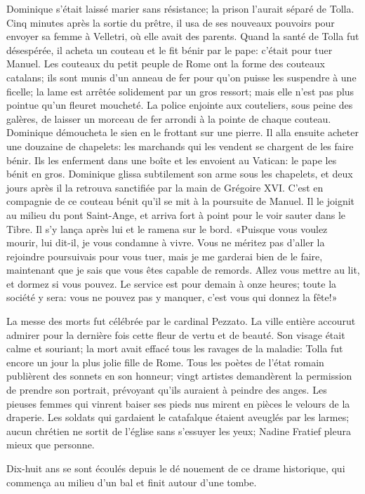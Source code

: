Dominique s'était laissé marier sans résistance; la prison l'aurait séparé de Tolla. Cinq minutes après la sortie du prêtre, il usa de ses nouveaux pouvoirs pour envoyer sa femme à Velletri, où elle avait des parents. Quand la santé de Tolla fut désespérée, il acheta un couteau et le fit bénir par le pape: c'était pour tuer Manuel. Les couteaux du petit peuple de Rome ont la forme des couteaux catalans; ils sont munis d'un anneau de fer pour qu'on puisse les suspendre à une ficelle; la lame est arrêtée solidement par un gros ressort; mais elle n'est pas plus pointue qu'un fleuret moucheté. La police enjointe aux couteliers, sous peine des galères, de laisser un morceau de fer arrondi à la pointe de chaque couteau. Dominique démoucheta le sien en le frottant sur une pierre. Il alla ensuite acheter une douzaine de chapelets: les marchands qui les vendent se chargent de les faire bénir. Ils les enferment dans une boîte et les envoient au Vatican: le pape les bénit en gros. Dominique glissa subtilement son arme sous les chapelets, et deux jours après il la retrouva sanctifiée par la main de Grégoire XVI. C'est en compagnie de ce couteau bénit qu'il se mit à la poursuite de Manuel. Il le joignit au milieu du pont Saint-Ange, et arriva fort à point pour le voir sauter dans le Tibre. Il s'y lança après lui et le ramena sur le bord. «Puisque vous voulez mourir, lui dit-il, je vous condamne à vivre. Vous ne méritez pas d'aller la rejoindre poursuivais pour vous tuer, mais je me garderai bien de le faire, maintenant que je sais que vous êtes capable de remords. Allez vous mettre au lit, et dormez si vous pouvez. Le service est pour demain à onze heures; toute la société y sera: vous ne pouvez pas y manquer, c'est vous qui donnez la fête!»

La messe des morts fut célébrée par le cardinal Pezzato. La ville entière accourut admirer pour la dernière fois cette fleur de vertu et de beauté. Son visage était calme et souriant; la mort avait effacé tous les ravages de la maladie: Tolla fut encore un jour la plus jolie fille de Rome. Tous les poètes de l'état romain publièrent des sonnets en son honneur; vingt artistes demandèrent la permission de prendre son portrait, prévoyant qu'ils auraient à peindre des anges. Les pieuses femmes qui vinrent baiser ses pieds nus mirent en pièces le velours de la draperie. Les soldats qui gardaient le catafalque étaient aveuglés par les larmes; aucun chrétien ne sortit de l'église sans s'essuyer les yeux; Nadine Fratief pleura mieux que personne.

Dix-huit ans se sont écoulés depuis le dé nouement de ce drame historique, qui commença au milieu d'un bal et finit autour d'une tombe.


